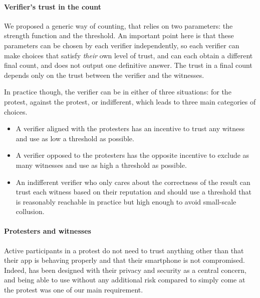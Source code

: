  \paragraph{Verifier's trust in the count} We proposed a generic way of counting, that relies on two parameters: the strength function and the threshold.
An important point here is that these parameters can be chosen by each verifier independently, so each verifier can make choices that satisfy \emph{their} own level of trust, and can each obtain a different final count, and \CROCUS does not output one definitive answer. The trust in a final count depends only on the trust between the verifier and the witnesses.

In practice though, the verifier can be in either of three situations: for the protest, against the protest, or indifferent, which leads to three main categories of choices.
\begin{itemize}
	\item A verifier aligned with the protesters has an incentive to trust any witness and use as low a threshold as possible.
	\item A verifier opposed to the protesters has the opposite incentive to exclude as many witnesses and use as high a threshold as possible.
	\item An indifferent verifier who only cares about the correctness of the result can trust each witness based on their reputation and should use a threshold that is reasonably reachable in practice but high enough to avoid small-scale collusion.
\end{itemize}

\paragraph{Protesters and witnesses} Active participants in a protest do not need to trust anything other than that their app is behaving properly and that their smartphone is not compromised. Indeed, \CROCUS has been designed with their privacy and security as a central concern, and being able to use \CROCUS without any additional risk compared to simply come at the protest was one of our main requirement.